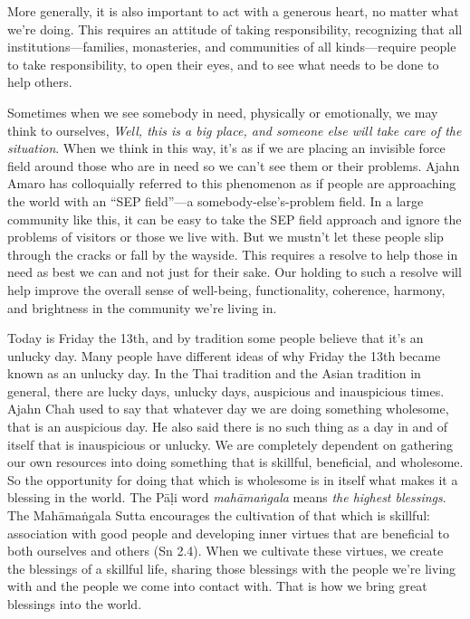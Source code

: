 More generally, it is also important to act with a generous heart, no 
matter what we're doing. This requires an attitude of taking 
responsibility, recognizing that all institutions---families, 
monasteries, and communities of all kinds---require people to take 
responsibility, to open their eyes, and to see what needs to be done to 
help others.

Sometimes when we see somebody in need, physically or emotionally, we 
may think to ourselves, \emph{Well, this is a big place, and someone 
else will take care of the situation}. When we think in this way, it's 
as if we are placing an invisible force field around those who are in 
need so we can't see them or their problems. Ajahn Amaro has 
colloquially referred to this phenomenon as if people are approaching 
the world with an ``SEP field''---a somebody-else's-problem field. In a 
large community like this, it can be easy to take the SEP field 
approach and ignore the problems of visitors or those we live with. But 
we mustn't let these people slip through the cracks or fall by the 
wayside. This requires a resolve to help those in need as best we can 
and not just for their sake. Our holding to such a resolve will help 
improve the overall sense of well-being, functionality, coherence, 
harmony, and brightness in the community we're living in.


Today is Friday the 13th, and by tradition some people believe that 
it's an unlucky day. Many people have different ideas of why Friday the 
13th became known as an unlucky day. In the Thai tradition and the 
Asian tradition in general, there are lucky days, unlucky days, 
auspicious and inauspicious times. Ajahn Chah used to say that whatever 
day we are doing something wholesome, that is an auspicious day. He 
also said there is no such thing as a day in and of itself that is 
inauspicious or unlucky. We are completely dependent on gathering our 
own resources into doing something that is skillful, beneficial, and 
wholesome. So the opportunity for doing that which is wholesome is in 
itself what makes it a blessing in the world. The Pāḷi word 
\emph{mahāmaṅgala} means \emph{the highest blessings}. The 
Mahāmaṅgala Sutta encourages the cultivation of that which is 
skillful: association with good people and developing inner virtues 
that are beneficial to both ourselves and others (Sn 2.4). When we 
cultivate these virtues, we create the blessings of a skillful life, 
sharing those blessings with the people we're living with and the 
people we come into contact with. That is how we bring great blessings 
into the world.

